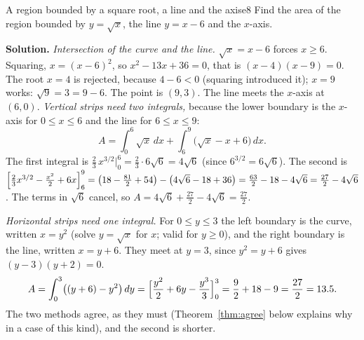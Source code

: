 \documentclass[11pt]{article}
\begin{document}
\begin{exmp}{A region bounded by a square root, a line and the axis}{e8}
Find the area of the region bounded by $y=\sqrt x$, the line $y=x-6$ and the $x$-axis.

\textbf{Solution.} \emph{Intersection of the curve and the line.} $\sqrt x=x-6$ forces $x\ge6$. Squaring, $x=(x-6)^2$, so $x^2-13x+36=0$, that is $(x-4)(x-9)=0$. The root $x=4$ is rejected, because $4-6<0$ (squaring introduced it); $x=9$ works: $\sqrt9=3=9-6$. The point is $(9,3)$. The line meets the $x$-axis at $(6,0)$.
\emph{Vertical strips need two integrals,} because the lower boundary is the $x$-axis for $0\le x\le6$ and the line for $6\le x\le9$:
\[
A=\int_0^6\sqrt x\,dx+\int_6^9\bigl(\sqrt x-x+6\bigr)\,dx .
\]
The first integral is $\frac23\,x^{3/2}\Big|_0^6=\frac23\cdot6\sqrt6=4\sqrt6$ (since $6^{3/2}=6\sqrt6$). The second is $\Bigl[\frac23x^{3/2}-\frac{x^2}2+6x\Bigr]_6^9=\left(18-\frac{81}2+54\right)-\left(4\sqrt6-18+36\right)=\frac{63}2-18-4\sqrt6=\frac{27}2-4\sqrt6$. The terms in $\sqrt6$ cancel, so $A=4\sqrt6+\frac{27}2-4\sqrt6=\frac{27}2$.

\emph{Horizontal strips need one integral.} For $0\le y\le3$ the left boundary is the curve, written $x=y^2$ (solve $y=\sqrt x$ for $x$; valid for $y\ge0$), and the right boundary is the line, written $x=y+6$. They meet at $y=3$, since $y^2=y+6$ gives $(y-3)(y+2)=0$.
\[
A=\int_0^3\bigl((y+6)-y^2\bigr)\,dy=\Bigl[\frac{y^2}2+6y-\frac{y^3}3\Bigr]_0^3=\frac92+18-9=\frac{27}2=13.5 .
\]
The two methods agree, as they must (Theorem~\ref{thm:agree} below explains why in a case of this kind), and the second is shorter.


\end{exmp}
\end{document}
